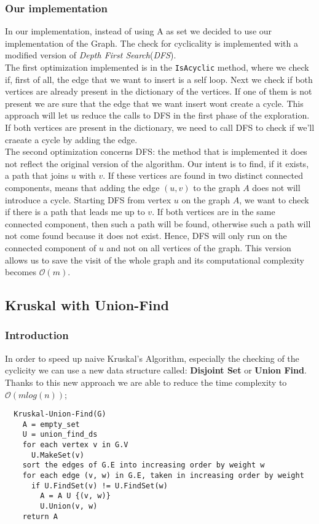 \subsubsection{Our implementation}
In our implementation, instead of using A as set we decided to use our implementation of the Graph.
The check for cyclicality is implemented with a modified version of \textit{Depth First Search}(\textit{DFS}).\\
The first optimization implemented is in the \verb|IsAcyclic| method, where we check if, first of all, the edge that we want 
to insert is a self loop. Next we check if both vertices are already present in the dictionary of the vertices.
If one of them is not present we are sure that the edge that we want insert wont create a cycle.
This approach will let us reduce the calls to DFS in the first phase of the exploration.
If both vertices are present in the dictionary, we need to call DFS to check if we'll craeate a cycle by adding the edge.\\
The second optimization concerns DFS: the method that is implemented it does not reflect the original version 
of the algorithm. Our intent is to find, if it exists, a path that joins $u$ with $v$. If these vertices are found 
in two distinct connected components, means that adding the edge $(u, v)$ to the graph $A$ does not will introduce a cycle. 
Starting DFS from vertex $u$ on the graph $A$, we want to check if there is a path that leads me up to $v$.
If both vertices are in the same connected component, then such a path will be found, otherwise such a path will 
not come found because it does not exist. Hence, DFS will only run on the connected component of $u$ and not on all 
vertices of the graph. This version allows us to save the visit of the whole graph and its computational complexity 
becomes $\mathcal{O}(m)$.

\subsection{Kruskal with Union-Find}
\subsubsection{Introduction}
In order to speed up naive Kruskal's Algorithm, especially the checking of the cyclicity we can use a new 
data structure called: \textbf{Disjoint Set} or \textbf{Union Find}.\\
Thanks to this new approach we are able to reduce the time complexity to $\mathcal{O}(mlog(n))$;
\begin{verbatim}
  Kruskal-Union-Find(G)
    A = empty_set
    U = union_find_ds
    for each vertex v in G.V
      U.MakeSet(v)
    sort the edges of G.E into increasing order by weight w
    for each edge (v, w) in G.E, taken in increasing order by weight
      if U.FindSet(v) != U.FindSet(w)
        A = A U {(v, w)}
        U.Union(v, w)
    return A
\end{verbatim}

